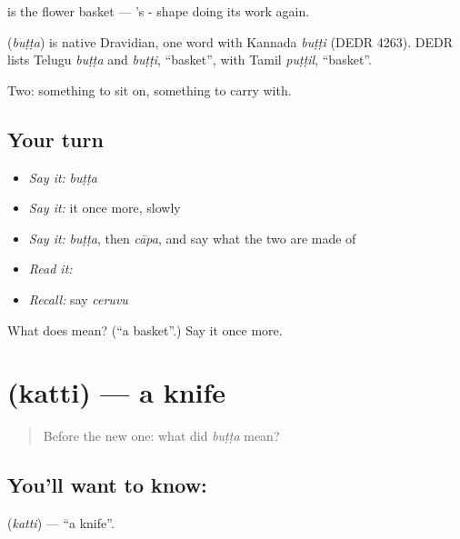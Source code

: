   is the flower basket — 's - shape doing its work again.

\begin{cousinweb}
\textbf{} (\emph{buṭṭa}) is native Dravidian, one word with Kannada \emph{buṭṭi} (DEDR 4263). DEDR lists Telugu \emph{buṭṭa} and \emph{buṭṭi}, \textquotedblleft{}basket\textquotedblright{}, with Tamil \emph{puṭṭil}, \textquotedblleft{}basket\textquotedblright{}.
\end{cousinweb}

\begin{grammarlens}[title={What you've built}]
Two: something to sit on, something to carry with.
\end{grammarlens}

\subsection*{Your turn}
\begin{itemize}
\raggedright
  \item \emph{Say it:} \emph{buṭṭa}
  \item \emph{Say it:} it once more, slowly
  \item \emph{Say it:} \emph{buṭṭa}, then \emph{cāpa}, and say what the two are made of
  \item \emph{Read it:} \textbf{}
  \item \emph{Recall:} say \emph{ceruvu}
\end{itemize}

\begin{tcolorbox}[breakable,colback=teal!4,colframe=teal!35!black,title={Before you move on}]
What does  mean? (\textquotedblleft{}a basket\textquotedblright{}.) Say it once more.
\end{tcolorbox}
\section[\texorpdfstring{\te{కత్తి} (katti)}{కత్తి (katti)}]{ (katti) — a knife}

\label{lesson:TE-C56-knife}



\begin{quote}
Before the new one: what did \emph{buṭṭa} mean?
\end{quote}

\subsection*{You'll want to know: }
\textbf{} (\emph{katti}) — \textquotedblleft{}a knife\textquotedblright{}.

